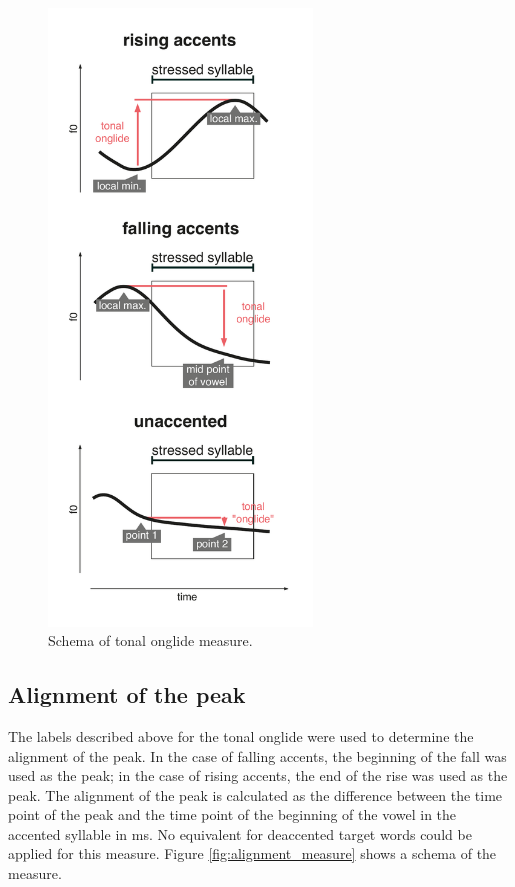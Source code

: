 \begin{figure}[htp]
\begin{center}
\includegraphics[width=7cm]{figures/ch5/measures_onglide.pdf}
\caption{Schema of tonal onglide measure.}
\label{fig:onglide_measure}
\end{center}
\end{figure}

\subsection{Alignment of the peak}

The labels described above for the tonal onglide were used to determine the alignment of the peak. In the case of falling accents, the beginning of the fall was used as the peak; in the case of rising accents, the end of the rise was used as the peak. The alignment of the peak is calculated as the difference between the time point of the peak and the time point of the beginning of the vowel in the accented syllable in ms. No equivalent for deaccented target words could be applied for this measure. Figure \ref{fig:alignment_measure} shows a schema of the measure.

